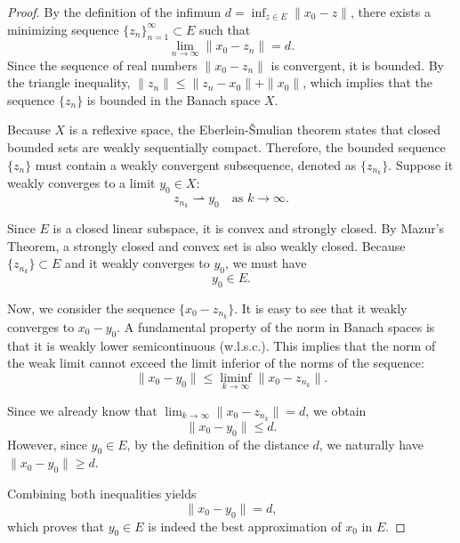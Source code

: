 \documentclass[11pt,a4paper]{article}
\theoremstyle{plain}
\theoremstyle{definition}
\begin{document}
\begin{proof}
    By the definition of the infimum \(d = \inf_{z \in E} \|x_0 - z\|\), there exists a minimizing sequence \(\{z_n\}_{n=1}^\infty \subset E\) such that
    \[
        \lim_{n \to \infty} \|x_0 - z_n\| = d.
    \]
    Since the sequence of real numbers \(\|x_0 - z_n\|\) is convergent, it is bounded. By the triangle inequality, \(\|z_n\| \le \|z_n - x_0\| + \|x_0\|\), which implies that the sequence \(\{z_n\}\) is bounded in the Banach space \(X\).

    Because \(X\) is a reflexive space, the Eberlein-\v{S}mulian theorem states that closed bounded sets are weakly sequentially compact. Therefore, the bounded sequence \(\{z_n\}\) must contain a weakly convergent subsequence, denoted as \(\{z_{n_k}\}\). Suppose it weakly converges to a limit \(y_0 \in X\):
    \[
        z_{n_k} \rightharpoonup y_0 \quad \text{as } k \to \infty.
    \]

    Since \(E\) is a closed linear subspace, it is convex and strongly closed. By Mazur's Theorem, a strongly closed and convex set is also weakly closed. Because \(\{z_{n_k}\} \subset E\) and it weakly converges to \(y_0\), we must have
    \[
        y_0 \in E.
    \]

    Now, we consider the sequence \(\{x_0 - z_{n_k}\}\). It is easy to see that it weakly converges to \(x_0 - y_0\). A fundamental property of the norm in Banach spaces is that it is weakly lower semicontinuous (w.l.s.c.). This implies that the norm of the weak limit cannot exceed the limit inferior of the norms of the sequence:
    \[
        \|x_0 - y_0\| \le \liminf_{k \to \infty} \|x_0 - z_{n_k}\|.
    \]

    Since we already know that \(\lim_{k \to \infty} \|x_0 - z_{n_k}\| = d\), we obtain
    \[
        \|x_0 - y_0\| \le d.
    \]
    However, since \(y_0 \in E\), by the definition of the distance \(d\), we naturally have \(\|x_0 - y_0\| \ge d\).

    Combining both inequalities yields
    \[
        \|x_0 - y_0\| = d,
    \]
    which proves that \(y_0 \in E\) is indeed the best approximation of \(x_0\) in \(E\).
\end{proof}
\end{document}
